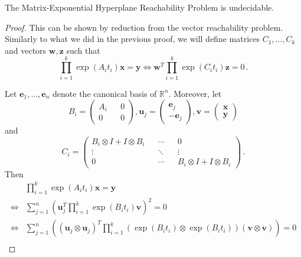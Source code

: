 \documentclass[format=acmsmall, review=false, screen=true]{acmart}
\newcommand{\Reals}{\mathbb{R}}
\newcommand{\myvector}{\boldsymbol}
\begin{document}
\begin{theorem}
The Matrix-Exponential Hyperplane Reachability Problem is undecidable.
\end{theorem}

\begin{proof}
This can be shown by reduction from the vector reachability problem.
Similarly to what we did in the previous proof, we will define
matrices $C_{1}, \ldots, C_{k}$ and vectors $\myvector{w},
\myvector{z}$ such that
\begin{equation*}
\prod \limits_{i=1}^{k} \exp(A_{i} t_{i}) \myvector{x} = \myvector{y}
\Leftrightarrow
\myvector{w}^{T} \prod\limits_{i=1}^{k} \exp(C_{i} t_{i}) \myvector{z} = 0 \, .
\end{equation*}

Let $\myvector{e}_{1}, \ldots, \myvector{e}_{n}$ denote the canonical basis of $\Reals^{n}$. Moreover, let
\begin{equation*}
B_{i} = \begin{pmatrix} A_{i} && 0 \\ 0 && 0 \end{pmatrix},
\myvector{u}_{j} = \begin{pmatrix} \myvector{e}_{j} \\ - \myvector{e}_{j} \end{pmatrix},
\myvector{v} = \begin{pmatrix} \myvector{x} \\ \myvector{y} \end{pmatrix}
\end{equation*}
and
\begin{equation*}
C_{i} = \begin{pmatrix} B_{i} \otimes I + I \otimes B_{i} && \cdots && 0 \\ \vdots && \ddots && \vdots \\ 0 && \cdots && B_{i} \otimes I + I \otimes B_{i} \end{pmatrix} \, .
\end{equation*}
Then
\begin{align*}
&\prod \limits_{i=1}^{k} \exp(A_{i} t_{i}) \myvector{x} = \myvector{y} \\
\Leftrightarrow &\sum \limits_{j=1}^{n} \left( \myvector{u}_{j}^{T} \prod \limits_{i=1}^{k} \exp(B_{i} t_{i}) \myvector{v} \right)^{2} = 0 \\
\Leftrightarrow &\sum \limits_{j=1}^{n} \left( \left( \myvector{u}_{j} \otimes \myvector{u}_{j} \right)^{T} \prod \limits_{i=1}^{k} \left( \exp( B_{i} t_{i} ) \otimes \exp(B_{i} t_{i}) \right) \left( \myvector{v} \otimes \myvector{v} \right) \right) = 0 \\

\end{align*}
\end{proof}
\end{document}
